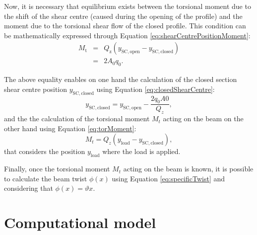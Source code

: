   Now, it is necessary that equilibrium exists between the torsional moment due to the shift of the shear centre (caused during the opening of the profile) and the moment due to the torsional shear flow of the closed profile. This condition can be mathematically expressed through Equation \ref{eq:shearCentrePositionMoment}:
  \begin{eqnarray}\label{eq:shearCentrePositionMoment}
    M_\mathrm{t} &=& Q_\mathrm{z} (y_{\mathrm{SC,open}} - y_{\mathrm{SC,closed}}) \nonumber \\
    &=& 2 A_0 q_0.
  \end{eqnarray}

  The above equality enables on one hand the calculation of the closed section shear centre position $y_{\mathrm{SC,closed}}$ using Equation \ref{eq:closedShearCentre}:
  \begin{equation} \label{eq:closedShearCentre}
    y_{\mathrm{SC,closed}} = y_{\mathrm{SC,open}} - \frac{2 q_0 A0}{Q_z},
  \end{equation}
  and the the calculation of the torsional moment $M_t$ acting on the beam on the other hand using Equation \ref{eq:torMoment}:
  \begin{equation} \label{eq:torMoment}
    M_t = Q_z (y_{\mathrm{load}} - y_{\mathrm{SC,closed}}),
  \end{equation}
  that considers the position $y_{\mathrm{load}}$ where the load is applied.

  Finally, once the torsional moment $M_t$ acting on the beam is known, it is possible to calculate the beam twist $\phi(x)$ using Equation \ref{eq:specificTwist} and considering that $\phi(x) = \vartheta x$.

\section{Computational model} \label{sec:computationalModel}

